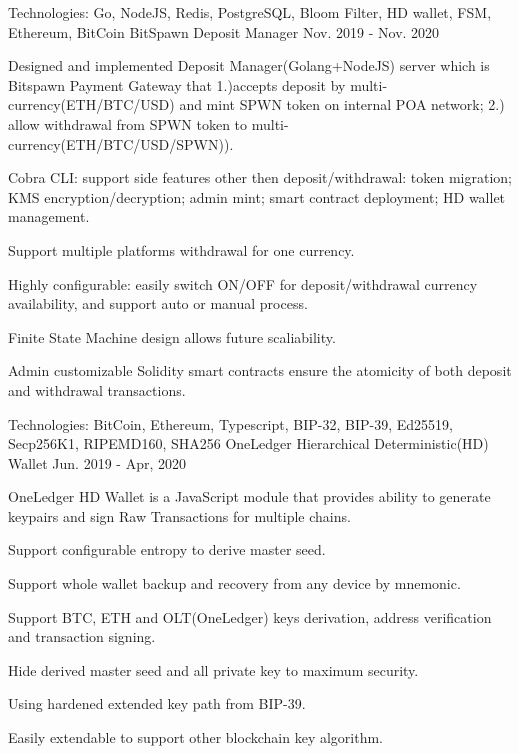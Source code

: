 \begin{cventries}
    \cventry
    {Technologies: \quad Go, NodeJS, Redis, PostgreSQL, Bloom Filter, HD wallet, FSM, Ethereum, BitCoin}
    {BitSpawn Deposit Manager}
    {}
    {Nov. 2019 - Nov. 2020}
    {
      \begin{cvitems}
      \item {Designed and implemented Deposit Manager(Golang+NodeJS) server which is Bitspawn Payment Gateway that 1.)accepts deposit by multi-currency(ETH/BTC/USD) and mint SPWN token on internal POA network; 2.) allow withdrawal from SPWN token to multi-currency(ETH/BTC/USD/SPWN)).}
        \item {Cobra CLI: support side features other then deposit/withdrawal: token migration; KMS encryption/decryption; admin mint; smart contract deployment; HD wallet management.}
        \item {Support multiple platforms withdrawal for one currency.}
        \item {Highly configurable: easily switch ON/OFF for deposit/withdrawal currency availability, and support auto or manual process.}
        \item {Finite State Machine design allows future scaliability.}
        \item {Admin customizable Solidity smart contracts ensure the atomicity of both deposit and withdrawal transactions.}  
      \end{cvitems}
    }
    
\cventry
    {Technologies: \quad BitCoin, Ethereum, Typescript, BIP-32, BIP-39, Ed25519, Secp256K1, RIPEMD160, SHA256}
    {OneLedger Hierarchical Deterministic(HD) Wallet}
    {}
    {Jun. 2019 - Apr, 2020}
    {
      \begin{cvitems}
        \item {OneLedger HD Wallet is a JavaScript module that provides ability to generate keypairs and sign Raw Transactions for multiple chains.}
        \item {Support configurable entropy to derive master seed.}
        \item {Support whole wallet backup and recovery from any device by mnemonic.}
        \item {Support BTC, ETH and OLT(OneLedger) keys derivation, address verification and transaction signing.}
        \item {Hide derived master seed and all private key to maximum security.}
        \item {Using hardened extended key path from BIP-39.}
        \item {Easily extendable to support other blockchain key algorithm.}
      \end{cvitems}
    }


\end{cventries}
